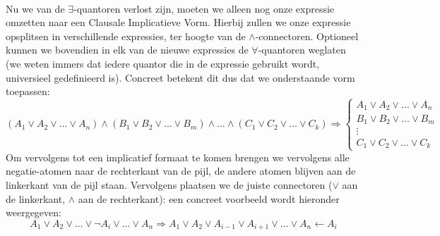 \paragraph{}
Nu we van de $\exists$-quantoren verlost zijn, moeten we alleen nog onze expressie omzetten naar een Clausale Implicatieve Vorm. Hierbij zullen we onze expressie opsplitsen in verschillende expressies, ter hoogte van de $\wedge$-connectoren. Optioneel kunnen we bovendien in elk van de nieuwe expressies de $\forall$-quantoren weglaten (we weten immers dat iedere quantor die in de expressie gebruikt wordt, universieel gedefinieerd is). Concreet betekent dit dus dat we onderstaande vorm toepassen:
\begin{equation}
\left(A_1\vee A_2\vee\ldots\vee A_n\right)\wedge\left(B_1\vee B_2\vee\ldots\vee B_m\right)\wedge\ldots\wedge\left(C_1\vee C_2\vee\ldots\vee C_k\right)\Rightarrow\left\{\begin{array}{l}
A_1\vee A_2\vee\ldots\vee A_n\\
B_1\vee B_2\vee\ldots\vee B_m\\
\vdots\\
C_1\vee C_2\vee\ldots\vee C_k
\end{array}\right.
\end{equation}
Om vervolgens tot een implicatief formaat te komen brengen we vervolgens alle negatie-atomen naar de rechterkant van de pijl, de andere atomen blijven aan de linkerkant van de pijl staan. Vervolgens plaatsen we de juiste connectoren ($\vee$ aan de linkerkant, $\wedge$ aan de rechterkant): een concreet voorbeeld wordt hieronder weergegeven:
\begin{equation}
A_1\vee A_2\vee\ldots\vee\neg A_i\vee\ldots\vee A_n\Rightarrow A_1\vee A_2\vee A_{i-1}\vee A_{i+1}\vee\ldots\vee A_n\leftarrow A_i
\end{equation}

